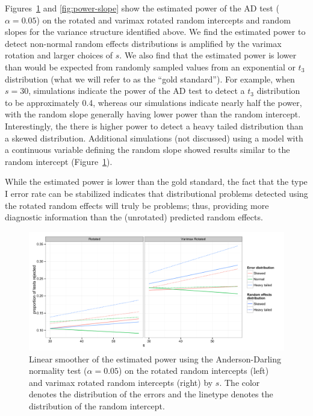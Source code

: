 \documentclass[12pt]{article} %
\begin{document}
Figures~\ref{fig:power-int} and \ref{fig:power-slope} show the estimated power of the AD test ($\alpha = 0.05$) on the rotated and varimax rotated random intercepts and random slopes for the variance structure identified above. We find the estimated power to detect non-normal random effects distributions is amplified by the varimax rotation and larger choices of $s$. We also find that the estimated power is lower than would be expected from randomly sampled values from an exponential or $t_3$ distribution (what we will refer to as the ``gold standard''). For example, when $s=30$, simulations indicate the power of the AD test to detect a $t_3$ distribution to be approximately 0.4, whereas our simulations indicate nearly half the power, with the random slope generally having lower power than the random intercept. Interestingly, the there is higher power to detect a heavy tailed distribution than a skewed distribution.  Additional simulations (not discussed) using a model with a continuous variable defining the random slope showed results similar to the random intercept (Figure~\ref{fig:power-int}).

While the estimated power is lower than the gold standard, the fact that the type I error rate can be stabilized indicates that distributional problems detected using the rotated random effects will truly be problems; thus, providing more diagnostic information than the (unrotated) predicted random effects.

\begin{figure}
	\centering
	\includegraphics[width=\textwidth]{ad_intercept_power.pdf}
	\caption{\label{fig:power-int} Linear smoother of the estimated power using the Anderson-Darling normality test ($\alpha = 0.05$) on the rotated random intercepts (left) and varimax rotated random intercepts (right) by $s$. The color denotes the distribution of the errors and the linetype denotes the distribution of the random intercept.}
\end{figure}
\end{document}
